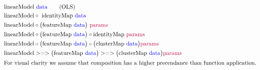 \begin{align*} 
& \textrm{linearModel} \ \textcolor{blue}{\text{data}} \tag{OLS}\\
& \textrm{linearModel} \circ \ \textrm{identityMap} \ \textcolor{blue}{\text{data}} \\ 
& \textrm{linearModel} \circ  \big(\textrm{featureMap} \ \textcolor{blue}{\text{data}}\big) \ \textcolor{purple}{\text{params}} \\ 
& \textrm{linearModel} \circ  \big(\textrm{featureMap} \ \textcolor{blue}{\text{data}}\big) \circ \textrm{identityMap} \  \textcolor{purple}{\text{params}} \\ 
& \textrm{linearModel} \circ  \big(\textrm{featureMap} \ \textcolor{blue}{\text{data}}\big) \circ \big(\textrm{clusterMap} \ \textcolor{blue}{\text{data}}\big)  \textcolor{purple}{\text{params}} \\ 
& \textrm{linearModel} >=>  \big(\textrm{featureMap} \ \textcolor{blue}{\text{data}}\big) >=> \big(\textrm{clusterMap} \ \textcolor{blue}{\text{data}}\big)  \textcolor{purple}{\text{params}} \\ 
\intertext{For visual clarity we assume that composition has a higher precendance than function application. }
\end{align*}